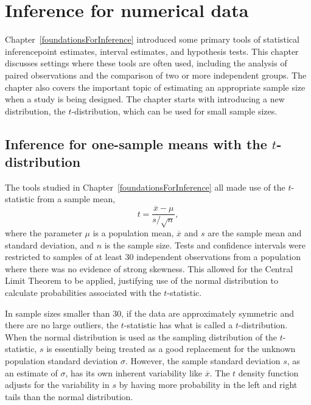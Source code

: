
\chapter{Inference for numerical data}
\label{inferenceForNumericalData}





Chapter~\ref{foundationsForInference} introduced some primary tools of statistical inference\textemdash point estimates, interval estimates, and hypothesis tests. This chapter discusses settings where these tools are often used, including the analysis of paired observations and the comparison of two or more independent groups. The chapter also covers the important topic of estimating an appropriate sample size when a study is being designed.  The chapter starts with introducing a new distribution, the $t$-distribution, which can be used for small sample sizes. 


\section{Inference for one-sample means with the $t$-distribution}
\label{oneSampleMeansWithTDistribution}

The tools studied in Chapter~\ref{foundationsForInference} all made use of the $t$-statistic from a sample mean,
\[t = \frac{\overline{x} - \mu}{s/\sqrt{n}},\]
where the parameter $\mu$ is a population mean, $\overline{x}$ and $s$ are the sample mean and standard deviation, and $n$ is the sample size. Tests and confidence intervals were restricted to samples of at least 30 independent observations from a population where there was no evidence of strong skewness. This allowed for the Central Limit Theorem to be applied, justifying use of the normal distribution to calculate probabilities associated with the $t$-statistic. 

In sample sizes smaller than 30, if the data are approximately symmetric and there are no large outliers, the $t$-statistic has what is called a $t$-distribution. When the normal distribution is used as the sampling distribution of the $t$-statistic, $s$ is essentially being treated as a good replacement for the unknown population standard deviation $\sigma$. However, the sample standard deviation $s$, as an estimate of $\sigma$, has its own inherent variability like $\overline{x}$. The $t$ density function adjusts for the variability in $s$ by having more probability in the left and right tails than the normal distribution.

